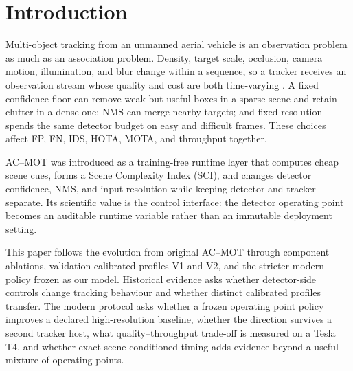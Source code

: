\section{Introduction}
Multi-object tracking from an unmanned aerial vehicle is an observation problem
as much as an association problem. Density, target scale, occlusion, camera
motion, illumination, and blur change within a sequence, so a tracker receives
an observation stream whose quality and cost are both time-varying
\cite{zhu2022visdrone,du2018uavdt}. A fixed confidence floor can remove weak
but useful boxes in a sparse scene and retain clutter in a dense one; NMS can
merge nearby targets; and fixed resolution spends the same detector budget on
easy and difficult frames. These choices affect FP, FN, IDS, HOTA, MOTA, and
throughput together.

AC--MOT was introduced as a training-free runtime layer that computes cheap
scene cues, forms a Scene Complexity Index (SCI), and changes detector
confidence, NMS, and input resolution while keeping detector and tracker
separate. Its scientific value is the control interface: the detector
operating point becomes an auditable runtime variable rather than an immutable
deployment setting.

This paper follows the evolution from original AC--MOT through component
ablations, validation-calibrated profiles V1 and V2, and the stricter modern
policy frozen as our model. Historical evidence asks whether detector-side controls
change tracking behaviour and whether distinct calibrated profiles transfer.
The modern protocol asks whether a frozen operating point policy improves a
declared high-resolution baseline, whether the direction survives a second
tracker host, what quality--throughput trade-off is measured on a Tesla T4, and
whether exact scene-conditioned timing adds evidence beyond a useful mixture of
operating points.

